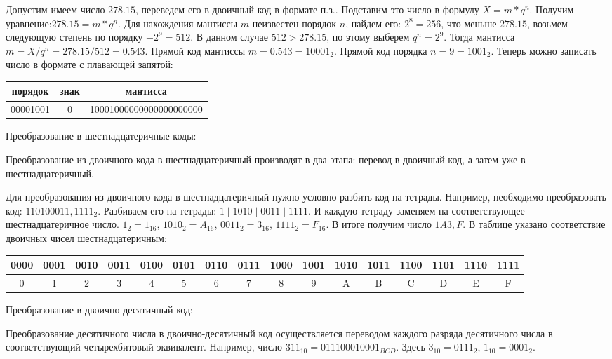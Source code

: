 \documentclass[unicode, 12pt, a4paper, oneside]{article}
\begin{document}
Допустим имеем число $ 278.15 $, переведем его в двоичный код в формате п.з.. Подставим это число в формулу $ X=m\ast q^{n} $. Получим уравнение:$ 278.15= m\ast q^{n} $. Для нахождения мантиссы $ m $ неизвестен порядок $ n $, найдем его: $ 2^{8}=256 $, что меньше $ 278.15 $, возьмем следующую степень по порядку $ -2^{9}=512 $. В данном случае $ 512>278.15 $, по этому выберем $ q^{n}=2^{9} $. Тогда мантисса $ m=X/q^{n} = 278.15 / 512 = 0.543 $. Прямой код мантиссы $ m = 0.543 = 10001_{2} $. Прямой код порядка $ n=9=1001_{2} $. Теперь можно записать число в формате с плавающей запятой:

\begin{center}
\begin{tabular}{|c|c|c|}
\hline порядок  & знак & мантисса                \\ 
\hline 00001001 & 0    & 10001000000000000000000 \\ 
\hline 
\end{tabular}
\end{center}

Преобразование в шестнадцатеричные коды:

Преобразование из двоичного кода в шестнадцатеричный производят в два этапа: перевод в двоичный код, а затем уже в шестнадцатеричный.

Для преобразования из двоичного кода в шестнадцатеричный нужно условно разбить код на тетрады. Например, необходимо преобразовать код: $ 110100011,1111_{2} $. Разбиваем его на тетрады: $ 1 \mid 1010 \mid 0011 \mid 1111 $. И каждую тетраду заменяем на соответствующее шестнадцатеричное число. $ 1_{2} = 1_{16} $, $ 1010_{2} = A_{16} $, $ 0011_{2} = 3_{16} $, $ 1111_{2} = F_{16} $. В итоге получим число $ 1A3,F $. В таблице указано соответствие двоичных чисел шестнадцатеричным:

\begin{center}
\small
\begin{tabular}{|c|c|c|c|c|c|c|c|c|c|c|c|c|c|c|c|}
\hline 0000 & 0001 & 0010 & 0011 & 0100 & 0101 & 0110 & 0111 & 1000 & 1001 & 1010 & 1011 & 1100 & 1101 & 1110 & 1111 \\ 
\hline 0 & 1 & 2 & 3 & 4 & 5 & 6 & 7 & 8 & 9 & A & B & C & D & E & F \\ 
\hline 
\end{tabular}
\end{center}

Преобразование в двоично-десятичный код:

Преобразование десятичного числа в двоично-десятичный код осуществляется переводом каждого разряда десятичного числа в соответствующий четырехбитовый эквивалент. Например, число $ 311_{10} = 011100010001_{BCD} $. Здесь  $3_{10} = 0111_{2}$, $1_{10} = 0001_{2}$.
\end{document}

